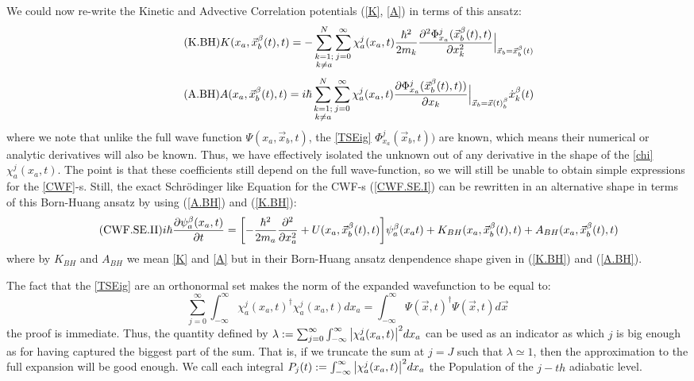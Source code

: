 \documentclass[11pt, a4paper]{article} %
\begin{document}
We could now re-write the Kinetic and Advective Correlation potentials (\ref{K}, \ref{A}) in terms of this ansatz:
\begin{equation}\label{K.BH}\tag{K.BH}
K(x_a, \vec{x}_b^\beta(t), t) = -  \sum_{\substack{k=1; \\ k\neq a}}^{N} \sum_{j=0}^\infty \chi_a^j(x_a,t) \frac{\hbar^2}{2m_k} \pdv[2]{ \Phi_{x_a}^j(\vec{x}_b^\beta(t),t)}{x_k}\Big\rvert_{\vec{x}_b=\vec{x}_b^\beta(t)}
\end{equation}
\begin{equation}\label{A.BH}\tag{A.BH}
A(x_a, \vec{x}_b^\beta(t), t) =  i \hbar \sum_{\substack{k=1; \\ k\neq a}}^{N} \sum_{j=0}^\infty \chi_a^j(x_a,t) \pdv{ \Phi_{x_a}^j(\vec{x}_b^\beta(t),t))}{x_k}\Big\rvert_{\vec{x}_b=\vec{x}(t)_b^\beta} \dot{x}_k^\beta(t)
\end{equation}
where we note that unlike the full wave function $\Psi(x_a, \vec{x}_b,t)$, the \ref{TSEig} $\Phi_{x_a}^j(\vec{x}_b,t))$ are known, which means their numerical or analytic derivatives will also be known. Thus, we have effectively isolated the unknown out of any derivative in the shape of the \ref{chi} $\chi^j_a(x_a,t)$. The point is that these coefficients still depend on the full wave-function, so we will still be unable to obtain simple expressions for the \ref{CWF}-s. Still, the exact Schrödinger like Equation for the CWF-s (\ref{CWF.SE.I}) can be rewritten in an alternative shape in terms of this Born-Huang ansatz by using (\ref{A.BH}) and (\ref{K.BH}):
\begin{equation}\label{CWF.SE.II}\tag{CWF.SE.II}
i\hbar \pdv{\psi_a^\beta(x_a, t)}{t} = \qty[- \frac{\hbar^2}{2m_a}\pdv[2]{}{x_a} + U(x_a, \vec{x}_b^\beta(t), t)]\psi_a^\beta(x_a t) + K_{BH}(x_a, \vec{x}_b^\beta(t), t) +A_{BH}(x_a, \vec{x}_b^\beta(t), t) 
\end{equation}
where by $ K_{BH}$ and $ A_{BH}$ we mean \ref{K} and \ref{A} but in their Born-Huang ansatz denpendence shape given in (\ref{K.BH}) and (\ref{A.BH}).

The fact that the \ref{TSEig} are an orthonormal set makes the norm of the expanded wavefunction to be equal to:
$$
\sum_{j=0}^\infty \int_{-\infty}^\infty \chi_a^j(x_a,t)^\dagger \chi_a^j(x_a,t) dx_a = \int_{-\infty}^\infty \Psi(\vec{x},t)^\dagger \Psi(\vec{x},t)d\vec{x}
$$
the proof is immediate. Thus, the quantity defined by $\lambda:=\sum_{j=0}^\infty \int_{-\infty}^\infty \qty|\chi_a^j(x_a,t)|^2 dx_a$ can be used as an indicator as which $j$ is big enough as for having captured the biggest part of the sum. That is, if we truncate the sum at $j=J$ such that $\lambda\simeq 1$, then the approximation to the full expansion will be good enough. We call each integral $P_j(t):=\int_{-\infty}^\infty \qty|\chi_a^j(x_a,t)|^2 dx_a$ the Population of the $j-th$ adiabatic level.
\newpage
\end{document}
